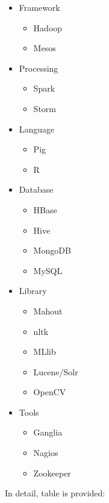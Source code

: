 \documentclass[9pt,twocolumn,twoside]{styles/osajnl}
\begin{document}
\begin{table}[htb]
\begin{itemize}
\item Framework
\begin{itemize}
   \item Hadoop
   \item Mesos
\end{itemize}
\item Processing
\begin{itemize}
   \item Spark
   \item Storm
\end{itemize}
\item Language
\begin{itemize}
   \item Pig
   \item R
\end{itemize}
\item Database
\begin{itemize}
   \item HBase
   \item Hive
   \item MongoDB
   \item MySQL
\end{itemize}
\item Library
\begin{itemize}
   \item Mahout
   \item nltk
   \item MLlib
   \item Lucene/Solr
   \item OpenCV
\end{itemize}
\item Tools
\begin{itemize}
   \item Ganglia
   \item Nagios
   \item Zookeeper
\end{itemize}
\end{itemize}


In detail, table is provided:

\begin{table}[htb]
  \begin{center}
    \begin{small}
      \begin{tabular}{l|m{3cm}|l|m{2cm}|m{2cm}|m{2cm}|m{2cm}}


\end{tabular}
\end{small}
\end{center}
\end{table}
\end{table}
\end{document}
